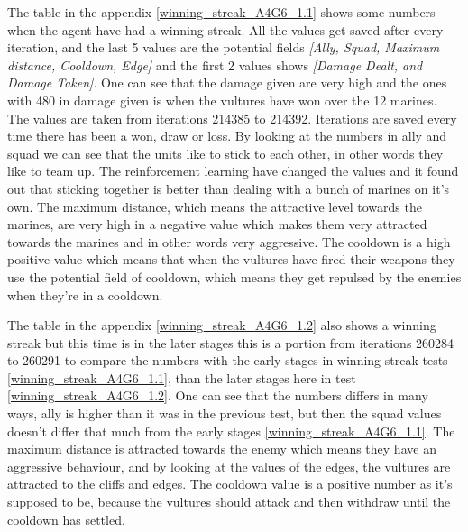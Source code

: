 

The table in the appendix \ref{winning_streak_A4G6_1.1} shows some numbers when the agent have had a winning streak. All the values get saved after every iteration, and the last 5 values are the potential fields \textit{[Ally, Squad, Maximum distance, Cooldown, Edge]} and the first 2 values shows \textit{[Damage Dealt, and Damage Taken]}. One can see that the damage given are very high and the ones with 480 in damage given is when the vultures have won over the 12 marines. The values are taken from iterations 214385 to 214392. Iterations are saved every time there has been a won, draw or loss. By looking at the numbers in ally and squad we can see that the units like to stick to each other, in other words they like to team up. The reinforcement learning have changed the values and it found out that sticking together is better than dealing with a bunch of marines on it's own. The maximum distance, which means the attractive level towards the marines, are very high in a negative value which makes them very attracted towards the marines and in other words very aggressive. The cooldown is a high positive value which means that when the vultures have fired their weapons they use the potential field of cooldown, which means they get repulsed by the enemies when they're in a cooldown. 






The table in the appendix \ref{winning_streak_A4G6_1.2} also shows a winning streak but this time is in the later stages this is a portion from iterations 260284 to 260291 to compare the numbers with the early stages in winning streak tests \ref{winning_streak_A4G6_1.1}, than the later stages here in test \ref{winning_streak_A4G6_1.2}. One can see that the numbers differs in many ways, ally is higher than it was in the previous test, but then the squad values doesn't differ that much from the early stages \ref{winning_streak_A4G6_1.1}. The maximum distance is attracted towards the enemy which means they have an aggressive behaviour, and by looking at the values of the edges, the vultures are attracted to the cliffs and edges. The cooldown value is a positive number as it's supposed to be, because the vultures should attack and then withdraw until the cooldown has settled.

